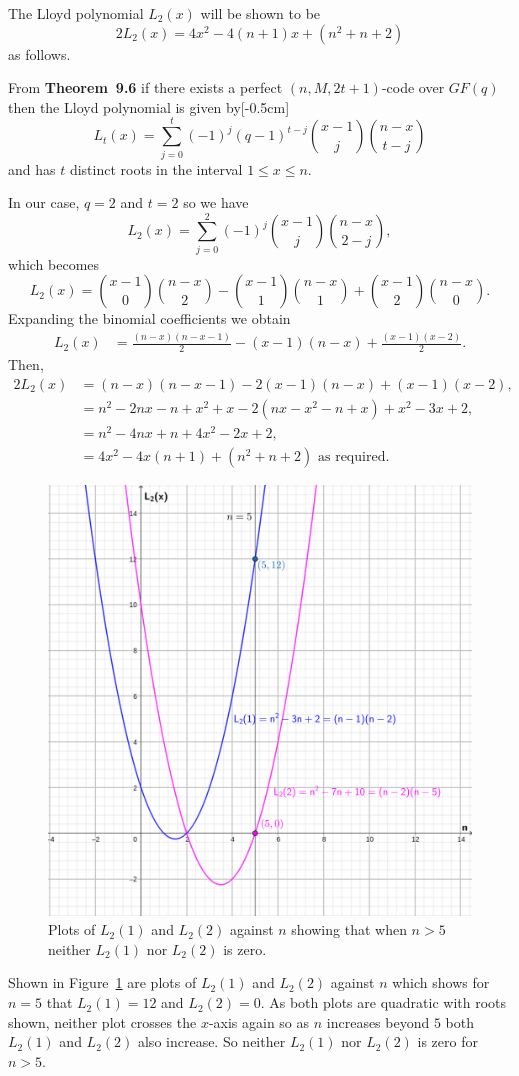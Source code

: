 The Lloyd polynomial $L_2(x)$ will be shown to be
\[
	2L_2(x) = 4x^2 - 4(n+1)x + (n^2 + n +2)
\]
as follows.

From \textbf{Theorem~9.6} if there exists a perfect $(n,M,2t+1)$-code over $GF(q)$ then the Lloyd polynomial is given by[-0.5cm]
\[
	L_t(x) =\sum_{j=0}^t (-1)^j(q-1)^{t-j}\binom{x-1}{j}\binom{n-x}{t-j}
\]
and has $t$ distinct roots in the interval $1\leq x\leq n$.

In our case, $q=2$ and $t=2$ so we have
\[
	L_2(x) =\sum_{j=0}^2 (-1)^j\binom{x-1}{j}\binom{n-x}{2-j},
\]
which becomes
\[
	L_2(x) = \binom{x-1}{0}\binom{n-x}{2} -\binom{x-1}{1}\binom{n-x}{1}+\binom{x-1}{2}\binom{n-x}{0}.
\]
Expanding the binomial coefficients we obtain
\begin{align*}
	L_2(x) &= \frac{(n-x)(n-x-1)}{2} - (x-1)(n-x) + \frac{(x-1)(x-2)}{2}.
\end{align*}
Then,
\begin{align*}
	2L_2(x) &= (n-x)(n-x-1) - 2(x-1)(n-x) + (x-1)(x-2),\\
&= n^2 - 2nx -n + x^2 +x -2\left(nx -x^2 -n +x\right) + x^2 -3x + 2,\\
&= n^2 - 4nx + n + 4x^2 -2x +2,\\
&= 4x^2 -4x(n+1) + (n^2 + n + 2)\text{ as required.}
\end{align*}
\begin{figure}[H]
\centering
  \includegraphics[width=0.8\linewidth]{q2b.png}
  \caption{Plots of $L_2(1)$ and $L_2(2)$ against $n$ showing that when $n>5$ neither $L_2(1)$ nor $L_2(2 )$ is zero.}
  \label{fig:graph1}
\end{figure}
Shown in Figure~\ref{fig:graph1} are plots of $L_2(1)$ and $L_2(2)$ against $n$ which shows for $n=5$ that $L_2(1)=12$ and $L_2(2)=0$. As both plots are quadratic with roots shown, neither plot crosses the $x$-axis again so as $n$ increases beyond $5$ both $L_2(1)$ and $L_2(2)$ also increase. So neither $L_2(1)$ nor $L_2(2)$ is zero for $n>5$.